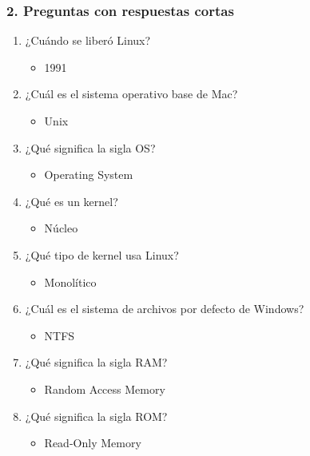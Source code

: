 \documentclass[11pt,twoside]{book}
\begin{document}
\subsubsection{2. Preguntas con respuestas cortas}
\begin{enumerate}[label=\textbf{\arabic*.}, leftmargin=2cm]

    \item ¿Cuándo se liberó Linux? 
    \begin{itemize}
        \item 1991
    \end{itemize}

    \item ¿Cuál es el sistema operativo base de Mac? 
    \begin{itemize}
        \item Unix
    \end{itemize}

    \item ¿Qué significa la sigla OS? 
    \begin{itemize}
        \item Operating System
    \end{itemize}

    \item ¿Qué es un kernel? 
    \begin{itemize}
        \item Núcleo
    \end{itemize}

    \item ¿Qué tipo de kernel usa Linux? 
    \begin{itemize}
        \item Monolítico
    \end{itemize}

    \item ¿Cuál es el sistema de archivos por defecto de Windows? 
    \begin{itemize}
        \item NTFS
    \end{itemize}

    \item ¿Qué significa la sigla RAM? 
    \begin{itemize}
        \item Random Access Memory
    \end{itemize}

    \item ¿Qué significa la sigla ROM? 
    \begin{itemize}
        \item Read-Only Memory
    \end{itemize}


\end{enumerate}
\end{document}
